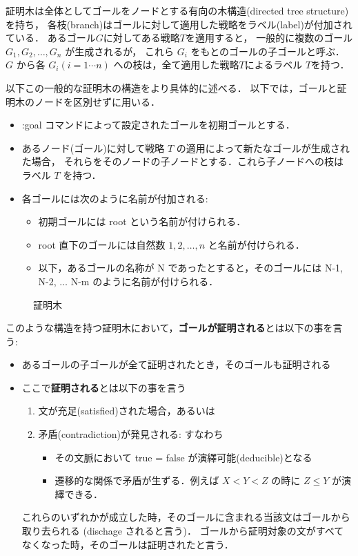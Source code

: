\documentclass[a4paper,oneside,10pt,here]{memoir}
\begin{document}
証明木は全体としてゴールをノードとする有向の木構造(directed tree structure)を持ち，
各枝(branch)はゴールに対して適用した戦略をラベル(label)が付加されている．
あるゴール$G$に対してある戦略$T$を適用すると，
一般的に複数のゴール$G_1, G_2, \ldots, G_n$ が生成されるが，
これら $G_i$ をもとのゴールの子ゴールと呼ぶ．
$G$ から各 $G_i (i = 1 \cdots n)$ への枝は，全て適用した戦略$T$によるラベル $T$を持つ．

以下この一般的な証明木の構造をより具体的に述べる．
以下では，ゴールと証明木のノードを区別せずに用いる．

\begin{itemize}
\item :goal コマンドによって設定されたゴールを初期ゴールとする．
\item あるノード(ゴール)に対して戦略 $T$ の適用によって新たなゴールが生成された場合，
  それらをそのノードの子ノードとする．これら子ノードへの枝はラベル $T$ を持つ．
\item 各ゴールには次のように名前が付加される:
  \begin{itemize}
    \item 初期ゴールには root という名前が付けられる．
    \item root 直下のゴールには自然数 $1, 2, \ldots ,n$ と名前が付けられる．
    \item 以下，あるゴールの名称が N であったとすると，そのゴールには
      N-1, N-2, $\ldots$ N-m のように名前が付けられる．
  \end{itemize}
\end{itemize}
\begin{figure}[hbt]
  \centering
  
  \caption{証明木}
  \label{fig:proof-tree}
\end{figure}

このような構造を持つ証明木において，\textbf{ゴールが証明される}とは以下の事を言う:
\begin{itemize}
\item あるゴールの子ゴールが全て証明されたとき，そのゴールも証明される
\item ここで\textbf{証明される}とは以下の事を言う
  \begin{enumerate}
  \item 文が充足(satisfied)された場合，あるいは
  \item 矛盾(contradiction)が発見される: すなわち
    \begin{itemize}
    \item その文脈において true = false が演繹可能(deducible)となる
    \item 遷移的な関係で矛盾が生ずる．例えば $X < Y < Z$ の時に
      $Z \le Y$ が演繹できる．
    \end{itemize}
  \end{enumerate}
  これらのいずれかが成立した時，そのゴールに含まれる当該文はゴールから
  取り去られる (dischage されると言う)．
  ゴールから証明対象の文がすべてなくなった時，そのゴールは証明されたと言う．
\end{itemize}
\end{document}
